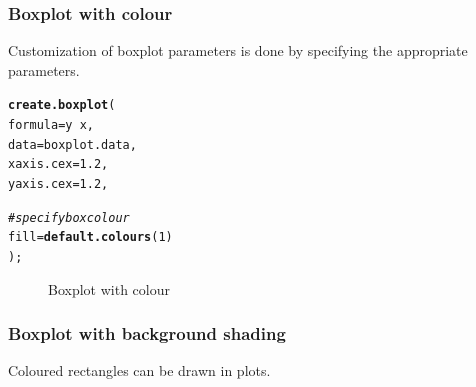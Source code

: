 \documentclass[letterpaper]{article}\usepackage[]{graphicx}\usepackage[]{color}
\makeatletter
\newcommand{\hlnum}[1]{\textcolor[rgb]{0.686,0.059,0.569}{#1}}%
\newcommand{\hlcom}[1]{\textcolor[rgb]{0.678,0.584,0.686}{\textit{#1}}}%
\newcommand{\hlopt}[1]{\textcolor[rgb]{0,0,0}{#1}}%
\newcommand{\hlstd}[1]{\textcolor[rgb]{0.345,0.345,0.345}{#1}}%
\newcommand{\hlkwc}[1]{\textcolor[rgb]{0.333,0.667,0.333}{#1}}%
\newcommand{\hlkwd}[1]{\textcolor[rgb]{0.737,0.353,0.396}{\textbf{#1}}}%
\newenvironment{kframe}{%
 \def\at@end@of@kframe{}%
 \ifinner\ifhmode%
  \def\at@end@of@kframe{\end{minipage}}%
  \begin{minipage}{\columnwidth}%
 \fi\fi%
 \def\FrameCommand##1{\hskip\@totalleftmargin \hskip-\fboxsep
 \colorbox{shadecolor}{##1}\hskip-\fboxsep
     \hskip-\linewidth \hskip-\@totalleftmargin \hskip\columnwidth}%
 \MakeFramed {\advance\hsize-\width
   \@totalleftmargin\z@ \linewidth\hsize
   \@setminipage}}%
 {\par\unskip\endMakeFramed%
 \at@end@of@kframe}
\newenvironment{knitrout}{}{} %
\makeatother
\begin{document}
\subsubsection{Boxplot with colour}
Customization of boxplot parameters is done by specifying the appropriate parameters.
\begin{knitrout}
\color{fgcolor}\begin{kframe}
\begin{alltt}
\hlkwd{create.boxplot}\hlstd{(}
    \hlkwc{formula} \hlstd{= y} \hlopt{~} \hlstd{x,}
    \hlkwc{data} \hlstd{= boxplot.data,}
    \hlkwc{xaxis.cex} \hlstd{=} \hlnum{1.2}\hlstd{,}
    \hlkwc{yaxis.cex} \hlstd{=} \hlnum{1.2}\hlstd{,}

    \hlcom{# specify box colour}
    \hlkwc{fill} \hlstd{=} \hlkwd{default.colours}\hlstd{(}\hlnum{1}\hlstd{)}
    \hlstd{);}
\end{alltt}
\end{kframe}\begin{figure}

{\centering {} 

}

\caption[Boxplot with colour]{Boxplot with colour\label{fig:boxplot2}}
\end{figure}


\end{knitrout}

\subsubsection{Boxplot with background shading}
Coloured rectangles can be drawn in plots.
\end{document}
